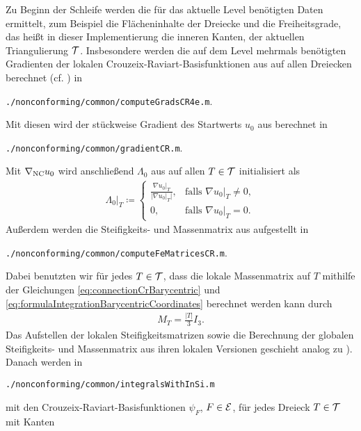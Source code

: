 Zu Beginn der Schleife werden die für das aktuelle Level benötigten Daten
ermittelt, zum Beispiel die Flächeninhalte der Dreiecke und die Freiheitsgrade,
das heißt in dieser Implementierung die inneren Kanten, der aktuellen
Triangulierung $\mathcal{T}$. 
Insbesondere werden die auf dem Level mehrmals benötigten Gradienten der
lokalen Crouzeix-Raviart-Basisfunktionen aus
 auf allen Dreiecken berechnet (cf.
\cite[Abschnitt 1.4.2]{CGKNRR10}) in
\begin{center}
  \texttt{./nonconforming/common/computeGradsCR4e.m}.
\end{center}
Mit diesen wird der stückweise Gradient des Startwerts $u_0$ aus
 berechnet in
\begin{center}
  \texttt{./nonconforming/common/gradientCR.m}.
\end{center}
Mit $\nabla_\textup{NC} u_0$ wird anschließend $\Lambda_0$ aus
 auf allen $T\in\mathcal{T}$ initialisiert als 
\begin{align}
  \label{eq:choiceInitialDualVariableImplementation}
  \Lambda_0|_T\coloneqq
  \begin{cases}
    \frac{\nabla u_0|_T}{|\nabla u_0|_T|},&\text{falls }\nabla u_0|_T\neq 0,\\
    0,&\text{falls }\nabla u_0|_T= 0.
  \end{cases}
\end{align}
Außerdem werden die Steifigkeits- und Massenmatrix aus
 aufgestellt in
\begin{center}
  \texttt{./nonconforming/common/computeFeMatricesCR.m}.
\end{center}
Dabei benutzten wir für jedes $T\in\mathcal{T}$, dass die lokale Massenmatrix auf
$T$ mithilfe der Gleichungen
\eqref{eq:connectionCrBarycentric} und
\eqref{eq:formulaIntegrationBarycentricCoordinates}
berechnet werden kann durch
\begin{align}
  \label{eq:localMassmatrix}
  M_T
  =
  \frac{|T|}{3}I_3.
\end{align}
Das Aufstellen der lokalen Steifigkeitsmatrizen sowie die Berechnung der
globalen Stei\-fig\-keits- und Massenmatrix aus ihren lokalen Versionen geschieht
analog zu \cite[Abschnitt 1.4.2]{CGKNRR10}).
Danach werden in
\begin{center}
  \texttt{./nonconforming/common/integralsWithInSi.m}
\end{center}
mit den Crouzeix-Raviart-Basisfunktionen
$\psi_F$, $F\in\mathcal{E}$, für jedes Dreieck $T\in\mathcal{T}$ mit Kanten
